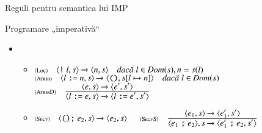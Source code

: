\documentclass[xcolor=pdftex,romanian,colorlinks]{beamer}
\begin{document}
\begin{section}{Reguli pentru semantica lui IMP}
\begin{frame}{Programare „imperativă“}
\begin{itemize}
\item[]
\begin{itemize}
\item[] $\reg[Loc]{\Ss{\c{\terminal{!} l,\stare}}{\c{n, \stare}}}{}{l\in\Dom(\stare), n = \stare(l)}$
\vitem[] $\reg[Atrib]{\Ss{\c{l \terminal{:=} n,\stare}}{\c{\Sskip,\stare[l \mapsto n]}}}{}{l\in\Dom(\stare)}$
\vitem[] $\reg[AtribD]{\Ss{\c{l \terminal{:=} e ,\stare}}{\c{l \terminal{:=} e' ,\stare'}}}{\Ss{\c{e,\stare}}{\c{e',\stare'}}}{}$
\end{itemize}
\vitem[]
\begin{itemize}
\item[] $\reg[Secv]{\Ss{\c{\Sskip \terminal{;} e_2,\stare}}{\c{e_2,\stare}}}{}{}$
\vitem[] $\reg[SecvS]{\Ss{\c{e_1 \terminal{;} e_2},\stare}{\c{e_1' \terminal{;} e_2,\stare'}}}{\Ss{\c{e_1,\stare}}{\c{e_1',\stare'}}}{}$
\end{itemize}
\end{itemize}
\end{frame}


\end{section}
\end{document}
